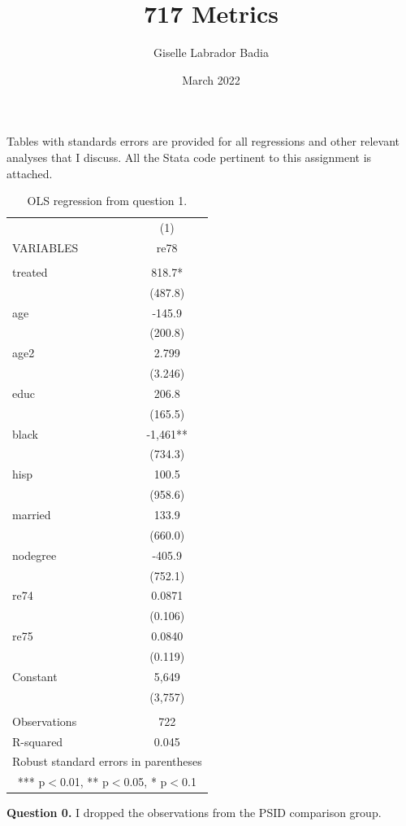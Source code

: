 \documentclass{article}
\title{717 Metrics}
\author{Giselle Labrador Badia}
\date{March 2022}
\theoremstyle{definition}
\begin{document}
\maketitle

 Tables with standards errors are provided for all regressions and other relevant analyses that I discuss. All the Stata code pertinent to this assignment is attached. 

\begin{table}[htbp]\centering
\begin{tabular}{lc} \hline
 & (1) \\
VARIABLES & re78 \\ \hline
 &  \\
treated & 818.7* \\
 & (487.8) \\
age & -145.9 \\
 & (200.8) \\
age2 & 2.799 \\
 & (3.246) \\
educ & 206.8 \\
 & (165.5) \\
black & -1,461** \\
 & (734.3) \\
hisp & 100.5 \\
 & (958.6) \\
married & 133.9 \\
 & (660.0) \\
nodegree & -405.9 \\
 & (752.1) \\
re74 & 0.0871 \\
 & (0.106) \\
re75 & 0.0840 \\
 & (0.119) \\
Constant & 5,649 \\
 & (3,757) \\
 &  \\
Observations & 722 \\
 R-squared & 0.045 \\ \hline
\multicolumn{2}{c}{ Robust standard errors in parentheses} \\
\multicolumn{2}{c}{ *** p$<$0.01, ** p$<$0.05, * p$<$0.1} \\
\end{tabular}
\caption{OLS regression from question 1.}
\end{table}

\hspace{0.41cm} \textbf{Question 0.} I dropped the observations from the PSID comparison group. 
\end{document}
